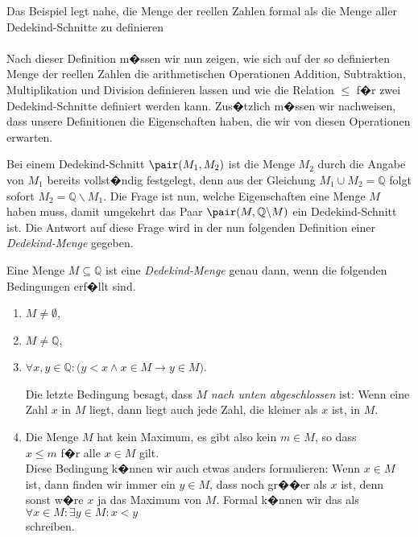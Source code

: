 Das Beispiel legt nahe, die Menge der reellen Zahlen formal als die Menge aller Dedekind-Schnitte zu
definieren
\\[0.2cm]
\hspace*{1.3cm}
\colorbox{orange}{
}
\\[0.2cm]
Nach dieser Definition m�ssen wir nun zeigen, wie sich auf der so definierten Menge der reellen
Zahlen die arithmetischen Operationen Addition, Subtraktion, Multiplikation und Division definieren
lassen und wie die Relation $\leq$ f�r zwei Dedekind-Schnitte definiert
werden kann.  Zus�tzlich m�ssen wir nachweisen, dass unsere Definitionen die Eigenschaften haben,
die wir von diesen Operationen erwarten.

Bei einem Dedekind-Schnitt $\pair(M_1,M_2)$ ist die Menge $M_2$ durch die Angabe von
$M_1$ bereits vollst�ndig festgelegt, denn aus der Gleichung $M_1 \cup M_2 = \mathbb{Q}$ folgt
sofort $M_2 = \mathbb{Q} \backslash M_1$.  Die Frage ist nun, welche Eigenschaften eine Menge $M$
haben muss, damit umgekehrt das Paar $\pair(M, \mathbb{Q} \backslash M)$ ein Dedekind-Schnitt ist.
Die Antwort auf diese Frage wird in der nun folgenden Definition einer \emph{Dedekind-Menge} gegeben.


\begin{Definition}
Eine Menge $M \subseteq \mathbb{Q}$ ist eine \emph{Dedekind-Menge} genau dann, wenn die
folgenden Bedingungen erf�llt sind.
\begin{enumerate}
\item $M \not= \emptyset$,
\item $M \not= \mathbb{Q}$,
\item $\forall x, y \in \mathbb{Q}: \bigl(y < x \wedge x \in M \rightarrow y \in M)$.

      Die letzte Bedingung besagt, dass $M$ \emph{nach unten abgeschlossen} ist:  Wenn eine
      Zahl $x$ in $M$ liegt, dann liegt auch jede Zahl, die kleiner als $x$ ist, in $M$.
\item Die Menge $M$ hat kein Maximum, es gibt also kein $m \in M$, so dass
      \\[0.2cm]
      \hspace*{1.3cm}
      $x \leq m$ \quad f�r alle $x \in M$ gilt.
      \\[0.2cm]
      Diese Bedingung k�nnen wir auch etwas anders formulieren:  Wenn $x \in M$ ist, dann finden wir
      immer ein $y \in M$, dass noch gr��er als $x$ ist, denn sonst w�re $x$ ja das Maximum von $M$.
      Formal k�nnen wir das als
      \\[0.2cm]
      \hspace*{1.3cm}
      $\forall x \in M: \exists y \in M: x < y$
      \\[0.2cm]
      schreiben.
\end{enumerate}
\end{Definition}

